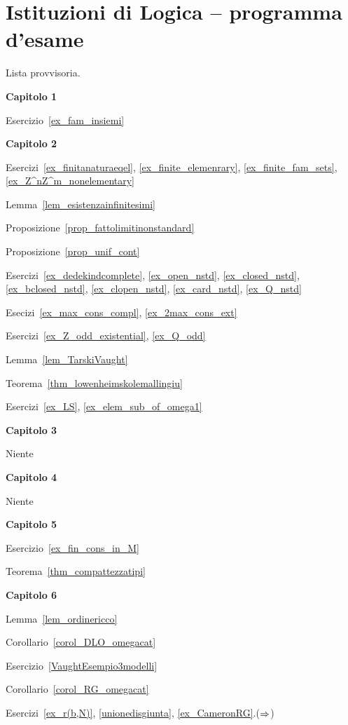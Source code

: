 \chapter*{Istituzioni di Logica -- programma d'esame }

Lista provvisoria.

\textbf{Capitolo 1}

Esercizio~\ref{ex_fam_insiemi} 

\textbf{Capitolo 2}

Esercizi~\ref{ex_finitanaturaeqel}, \ref{ex_finite_elemenrary}, \ref{ex_finite_fam_sets}, \ref{ex_Z^nZ^m_nonelementary}

Lemma~\ref{lem_esistenzainfinitesimi}

Proposizione~\ref{prop_fattolimitinonstandard}

Proposizione~\ref{prop_unif_cont}

Esercizi~\ref{ex_dedekindcomplete}, \ref{ex_open_nstd}, \ref{ex_closed_nstd}, \ref{ex_bclosed_nstd}, \ref{ex_clopen_nstd}, \ref{ex_card_nstd}, \ref{ex_Q_nstd}

Esecizi~\ref{ex_max_cons_compl}, \ref{ex_2max_cons_ext}

Esercizi~\ref{ex_Z_odd_existential}, \ref{ex_Q_odd}

Lemma~\ref{lem_TarskiVaught}

Teorema~\ref{thm_lowenheimskolemallingiu}

Esercizi~\ref{ex_LS}, \ref{ex_elem_sub_of_omega1}

\textbf{Capitolo 3}

Niente


\textbf{Capitolo 4}

Niente

\textbf{Capitolo 5}

Esercizio~\ref{ex_fin_cons_in_M}

Teorema~\ref{thm_compattezzatipi}

\textbf{Capitolo 6}

Lemma~\ref{lem_ordinericco}

Corollario~\ref{corol_DLO_omegacat}

Esercizio~\ref{VaughtEsempio3modelli}

Corollario~\ref{corol_RG_omegacat}

Esercizi~\ref{ex_r(b,N)}, \ref{unionedisgiunta}, \ref{ex_CameronRG}.($\Rightarrow$) 


